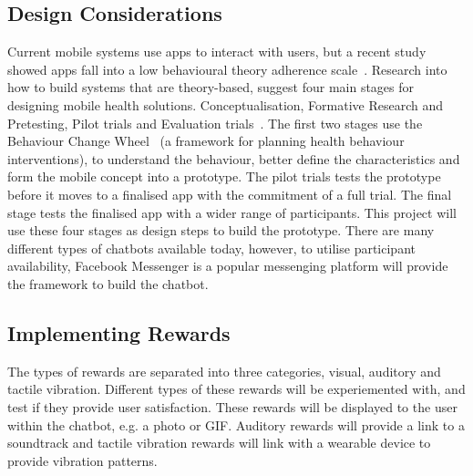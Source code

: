 \subsection{Design Considerations}
Current mobile systems use apps to interact with users, but a recent study showed apps fall into a low behavioural theory adherence scale~\cite{article_mhealth}. Research into how to build systems that are theory-based, suggest four main stages for designing mobile health solutions. Conceptualisation, Formative Research and Pretesting, Pilot trials and Evaluation trials~\cite{article_mhealth}. The first two stages use the Behaviour Change Wheel~\cite{article_behaviour_change_wheel} (a framework for planning health behaviour interventions), to understand the behaviour, better define the characteristics and form the mobile concept into a prototype. The pilot trials tests the prototype before it moves to a finalised app with the commitment of a full trial. The final stage tests the finalised app with a wider range of participants. This project will use these four stages as design steps to build the prototype.\newline
\newline
There are many different types of chatbots available today, however, to utilise participant availability, Facebook Messenger is a popular messenging platform will provide the framework to build the chatbot.

\subsection{Implementing Rewards}
The types of rewards are separated into three categories, visual, auditory and tactile vibration. Different types of these rewards will be experiemented with, and test if they provide user satisfaction. These rewards will be displayed to the user within the chatbot, e.g. a photo or GIF. Auditory rewards will provide a link to a soundtrack and tactile vibration rewards will link with a wearable device to provide vibration patterns.

\newpage






